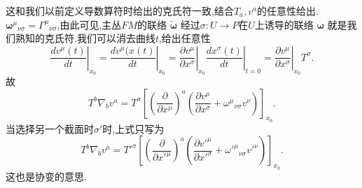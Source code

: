 \documentclass[../main.tex]{subfiles}
\begin{document}
    这和我们以前定义导数算符时给出的克氏符一致,结合$T_a,v^a$的任意性给出.$\bm{\omega}^{\mu}{}_{\nu\sigma} = \Gamma^{\mu}{}_{\nu\sigma}$,由此可见,主丛$FM$的联络 $\bm{\tilde{\omega}} $ 经过$\sigma :U \to P$在$U$上诱导的联络
     $\bm{\omega} $ 就是我们熟知的克氏符.我们可以消去曲线$t$,给出任意性
      \[
        \left.\frac{d v^\mu(t)}{dt}\right|_{x_0} = \left.\frac{d v^\mu(x(t)}{dt}\right|_{x_0} = \left.\frac{\partial v^\mu}{\partial x^\sigma}\right|_{x_0} \left.\frac{d x^\sigma(t)}{dt}\right|_{t=0} = \left.\frac{\partial v^\mu}{\partial x^\sigma}\right|_{x_0} T^\sigma
     .\] 
     故\[
       T^b \nabla_b v^a = T^\sigma\left[\left( \frac{\partial}{\partial x^\mu}  \right)^a \left( \frac{\partial v^\mu}{\partial x^\sigma} + \omega^{\mu}{}_{\nu\sigma}v^\nu \right)   \right]_{x_0} 
     .\] 
     当选择另一个截面时$\sigma'$时,上式只写为\[
           T^b \nabla_b v^a = T'^\sigma\left[\left( \frac{\partial}{\partial x'^\mu}  \right)^a \left( \frac{\partial v'^\mu}{\partial x'^\sigma} + \omega'^{\mu}{}_{\nu\sigma}v'^\nu \right)   \right]_{x_0} 
     .\] 
     这也是协变的意思.
\end{document}
